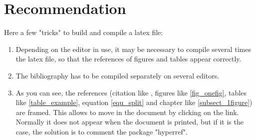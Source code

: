 \documentclass[a4paper,12pt]{article}
\begin{document}
\section{Recommendation}
Here a few "tricks" to build and compile a latex file:
\begin{enumerate}
 \item Depending on the editor in use, it may be necessary to compile several times the latex file, so that the references of figures and tables appear correctly.
 \item The bibliography has to be compiled separately on several editors.
 \item As you can see, the references (citation like \cite{baumann}, figures like \ref{fig_onefig}, tables like \ref{table_example}, equation \ref{equ_split} and chapter like \ref{subsect_1figure}) are framed. This allows to move in the document by clicking on the link. Normally it does not appear when the document is printed, but if it is the case, the solution is to comment the package "hyperref".
\end{enumerate}


\newpage


\end{document}
